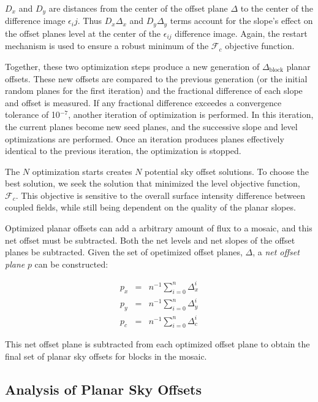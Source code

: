 \documentclass[iop]{emulateapj}
\begin{document}
$D_x$ and $D_y$ are distances from the center of the offset plane $\Delta$ to the center of the difference image $\epsilon_ij$. Thus $D_x\Delta_x$ and $D_y\Delta_y$ terms account for the slope's effect on the offset planes level at the center of the $\epsilon_{ij}$ difference image. Again, the restart mechanism is used to ensure a robust minimum of the $\mathcal{F}_c$ objective function.

Together, these two optimization steps produce a new generation of $\Delta_\mathrm{block}$ planar offsets. These new offsets are compared to the previous generation (or the initial random planes for the first iteration) and the fractional difference of each slope and offset is measured. If any fractional difference exceedes a convergence tolerance of 10$^{-7}$, another iteration of optimization is performed. In this iteration, the current planes become new seed planes, and the successive slope and level optimizations are performed. Once an iteration produces planes effectively identical to the previous iteration, the optimization is stopped.

The $N$ optimization starts creates $N$ potential sky offset solutions. To choose the best solution, we seek the solution that minimized the level objective function, $\mathcal{F}_c$. This objective is sensitive to the overall surface intensity difference between coupled fields, while still being dependent on the quality of the planar slopes.

Optimized planar offsets can add a arbitrary amount of flux to a mosaic, and this net offset must be subtracted. Both the net levels and net slopes of the offset planes be subtracted. Given the set of opetimized offset planes, $\Delta$, a \emph{net offset plane} $p$ can be constructed:

\begin{eqnarray}
	p_x & = & n^{-1} \sum_{i=0}^n \Delta_x^i \\
	p_y & = & n^{-1} \sum_{i=0}^n \Delta_y^i \\
	p_c & = & n^{-1} \sum_{i=0}^n \Delta_c^i
\end{eqnarray}

\noindent This net offset plane is subtracted from each optimized offset plane to obtain the final set of planar sky offsets for blocks in the mosaic.

\subsection{Analysis of Planar Sky Offsets}


\end{document}
